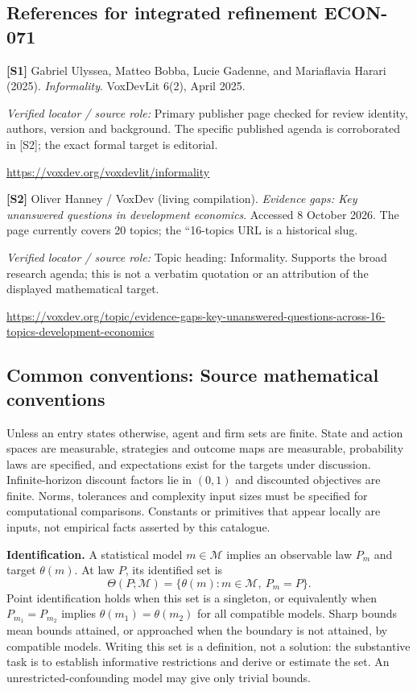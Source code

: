 \documentclass[11pt,a4paper]{article}
\begin{document}
\subsection*{References for integrated refinement ECON-071}
{\footnotesize\raggedright
\par\noindent\textbf{[S1]} Gabriel Ulyssea, Matteo Bobba, Lucie Gadenne, and Mariaflavia Harari (2025). \emph{Informality}. VoxDevLit 6(2), April 2025.\par \textit{Verified locator / source role:} Primary publisher page checked for review identity, authors, version and background. The specific published agenda is corroborated in [S2]; the exact formal target is editorial.\par \url{https://voxdev.org/voxdevlit/informality}\par\smallskip
\par\noindent\textbf{[S2]} Oliver Hanney / VoxDev (living compilation). \emph{Evidence gaps: Key unanswered questions in development economics}. Accessed 8 October 2026. The page currently covers 20 topics; the ``16-topics URL is a historical slug.\par \textit{Verified locator / source role:} Topic heading: Informality. Supports the broad research agenda; this is not a verbatim quotation or an attribution of the displayed mathematical target.\par \url{https://voxdev.org/topic/evidence-gaps-key-unanswered-questions-across-16-topics-development-economics}\par\smallskip
}

\subsection*{Common conventions: Source mathematical conventions}

Unless an entry states otherwise, agent and firm sets are finite. State and action spaces are measurable, strategies and outcome maps are measurable, probability laws are specified, and expectations exist for the targets under discussion. Infinite-horizon discount factors lie in $(0,1)$ and discounted objectives are finite. Norms, tolerances and complexity input sizes must be specified for computational comparisons. Constants or primitives that appear locally are inputs, not empirical facts asserted by this catalogue.

\textbf{Identification.} A statistical model $m\in\mathcal M$ implies an observable law $P_m$ and target $\theta(m)$. At law $P$, its identified set is
\[
\Theta(P;\mathcal M)=\{\theta(m):m\in\mathcal M,\ P_m=P\}.
\]
Point identification holds when this set is a singleton, or equivalently when $P_{m_1}=P_{m_2}$ implies $\theta(m_1)=\theta(m_2)$ for all compatible models. Sharp bounds mean bounds attained, or approached when the boundary is not attained, by compatible models. Writing this set is a definition, not a solution: the substantive task is to establish informative restrictions and derive or estimate the set. An unrestricted-confounding model may give only trivial bounds.
\end{document}
